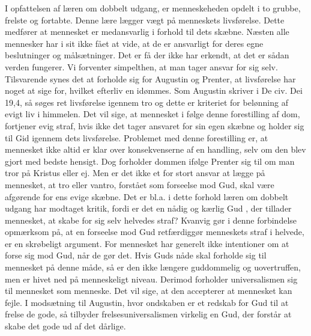 I opfattelsen af læren om dobbelt udgang, er menneskeheden opdelt i to grubbe, frelste og fortabte. Denne lære lægger vægt på menneskets livsførelse. Dette medfører at mennesket er medansvarlig i forhold til dets skæbne. Næsten alle mennesker har i sit ikke fået at vide, at de er ansvarligt for deres egne beslutninger og målsætninger. Det er få der ikke har erkendt, at det er sådan verden fungerer. Vi forventer simpelthen, at man tager ansvar for sig selv. Tilsvarende synes det at forholde sig for Augustin og Prenter, at livsførelse har noget at sige for, hvilket efterliv en idømmes. Som Augustin skriver i De civ. Dei 19,4, så søges ret livsførelse igennem tro og dette er kriteriet for belønning af evigt liv i himmelen. Det vil sige, at mennesket i følge denne forestilling af dom, fortjener evig straf, hvis ikke det tager ansvaret for sin egen skæbne og holder sig til Gid igennem dets livsførelse. Problemet med denne forestilling er, at mennesket ikke altid er klar over konsekvenserne af en handling, selv om den blev gjort med bedste hensigt. Dog forholder dommen ifølge Prenter sig til om man tror på Kristus eller ej. Men er det ikke et for stort ansvar at lægge på mennesket, at tro eller vantro, forstået som forseelse mod Gud, skal være afgørende for ens evige skæbne. Det er bl.a. i dette forhold læren om dobbelt udgang har modtaget kritik, fordi er det en nådig og kærlig Gud , der tillader mennesket, at skabe for sig selv helvedes straf? Kvanvig gør i denne forbindelse opmærksom på, at en forseelse mod Gud retfærdiggør menneskets straf i helvede, er en skrøbeligt argument. For mennesket har generelt ikke intentioner om at forse sig mod Gud, når de gør det. Hvis Guds nåde skal forholde sig til mennesket på denne måde, så er den ikke længere guddommelig og uovertruffen, men er hivet ned på menneskeligt niveau. Derimod forholder universalismen sig til mennesket som menneske. Det vil sige, at den accepterer at mennesket kan fejle. I modsætning til Augustin, hvor ondskaben er et redskab for Gud til at frelse de gode, så tilbyder frelsesuniversalismen virkelig en Gud, der forstår at skabe det gode ud af det dårlige.

